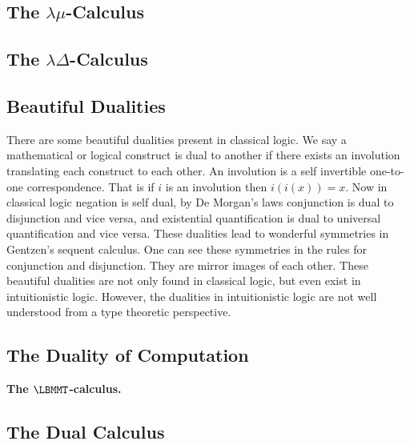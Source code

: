 \subsection{The $\lambda\mu$-Calculus}
\label{subsec:the_lambda-mu-calculus}


\subsection{The $\lambda\Delta$-Calculus}
\label{subsec:the_lambda-delta-calculus}


\subsection{Beautiful Dualities}
\label{subsec:beautiful_dualities}
There are some beautiful dualities present in classical logic.  We say
a mathematical or logical construct is dual to another if there exists
an involution translating each construct to each other.  An involution
is a self invertible one-to-one correspondence.  That is if $i$ is an
involution then $i(i(x)) = x$.  Now in classical logic negation is
self dual, by De Morgan's laws conjunction is dual to disjunction and
vice versa, and existential quantification is dual to universal
quantification and vice versa.  These dualities lead to wonderful
symmetries in Gentzen's sequent calculus.  One can see these
symmetries in the rules for conjunction and disjunction.  They are
mirror images of each other.  These beautiful dualities are not
only found in classical logic, but even exist in intuitionistic logic.
However, the dualities in intuitionistic logic are not well understood
from a type theoretic perspective.

\subsection{The Duality of Computation}
\label{subsec:the_duality_of_computation}
\textbf{The $\LBMMT$-calculus.} 

\subsection{The Dual Calculus}
\label{subsec:the_dual_calculus}


